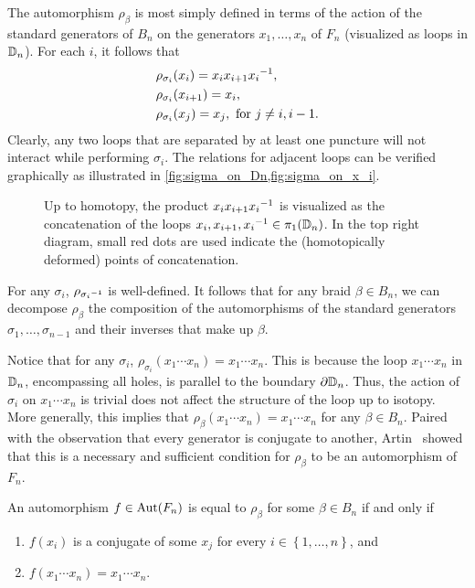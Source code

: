The automorphism $\rho_\beta$ is most simply defined in terms of the action of the standard generators of $B_n$ on the generators $x_1,\dots,x_n$ of $F_n$ (visualized as loops in $\mathbb{D}_n$). For each $i$, it follows that
\begin{align}
    &\rho_{\sigma_i}(x_{i}) = x_{i}x_{i+1} { x_{i} }^{-1}, \label{eq:rho_i}\\
    &\rho_{\sigma_i}(x_{i+1}) = x_{i}, \label{eq:rho_ip1}\\
    &\rho_{\sigma_i}(x_j) = x_j, \textrm{ for } j\neq i,i-1.\label{eq:rho_j}
\end{align}
Clearly, any two loops that are separated by at least one puncture will not interact while performing $\sigma_i$. The relations for adjacent loops can be verified graphically as illustrated in \cref{fig:sigma_on_Dn,fig:sigma_on_x_i}.
\begin{figure}[htbp]
    \centering
    
    \caption{Up to homotopy, the product $x_i x_{i+1} { x_i }^{-1}$ is visualized as the concatenation of the loops $x_i,x_{i+1},{ x_i }^{-1}\in\pi_1(\mathbb{D}_n)$. In the top right diagram, small red dots are used indicate the (homotopically deformed) points of concatenation.}\label{fig:sigma_on_x_i}
\end{figure}

For any $\sigma_i$, $\rho_{{ \sigma_i }^{-1}}$ is well-defined. It follows that for any braid $\beta\in B_n$, we can decompose $\rho_\beta$ the composition of the automorphisms of the standard generators $\sigma_1,\dots,\sigma_{n-1}$ and their inverses that make up $\beta$. 

Notice that for any $\sigma_i$, $\rho_{\sigma_i}(x_1\cdots x_n) = x_1\cdots x_n$. This is because the loop $x_1\cdots x_n$ in $\mathbb{D}_n$, encompassing all holes, is parallel to the boundary $\partial\mathbb{D}_n$. Thus, the action of $\sigma_i$ on $x_1\cdots x_n$ is trivial does not affect the structure of the loop up to isotopy. More generally, this implies that $\rho_\beta(x_1\cdots x_n) = x_1\cdots x_n$ for any $\beta\in B_n$. Paired with the observation that every generator is conjugate to another, Artin~\cite{Artin1947} showed that this is a necessary and sufficient condition for $\rho_\beta$ to be an automorphism of $F_n$.

\begin{theorem}\label{thm:autFn}
    An automorphism $f\in\textrm{Aut}\!\left( F_n \right)$ is equal to $\rho_\beta$ for some $\beta\in B_n$ if and only if
    \begin{enumerate}
        \item $f(x_i)$ is a conjugate of some $x_j$ for every $i\in\left\{ 1,\dots,n \right\}$, and
        \item $f(x_1\cdots x_n) = x_1\cdots x_n$.
    \end{enumerate}
\end{theorem}

